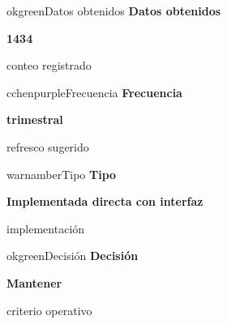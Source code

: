 \documentclass[9pt,a4paper]{extarticle}
\begin{document}
\vspace{0.04cm}
\begin{minipage}{0.24\textwidth}
\begin{metricbox}{okgreen}{Datos obtenidos}
{\large\bfseries Datos obtenidos}\par
{\Large\bfseries 1434}\par
{\normalsize conteo registrado}
\end{metricbox}
\end{minipage}\hfill
\begin{minipage}{0.24\textwidth}
\begin{metricbox}{cchenpurple}{Frecuencia}
{\large\bfseries Frecuencia}\par
{\large\bfseries trimestral}\par
{\normalsize refresco sugerido}
\end{metricbox}
\end{minipage}\hfill
\begin{minipage}{0.24\textwidth}
\begin{metricbox}{warnamber}{Tipo}
{\large\bfseries Tipo}\par
{\normalsize\bfseries Implementada directa con interfaz}\par
{\normalsize implementación}
\end{metricbox}
\end{minipage}\hfill
\begin{minipage}{0.24\textwidth}
\begin{metricbox}{okgreen}{Decisión}
{\large\bfseries Decisión}\par
{\normalsize\bfseries Mantener}\par
{\normalsize criterio operativo}
\end{metricbox}
\end{minipage}
\end{document}
